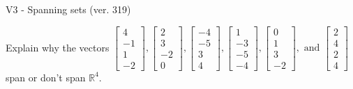 \begin{exercise}
  \begin{exerciseTitle}V3 - Spanning sets (ver. 319)\end{exerciseTitle}
  \begin{exerciseStatement}
    Explain why the vectors \(\left[\begin{array}{r}
4 \\
-1 \\
1 \\
-2
\end{array}\right] , \left[\begin{array}{r}
2 \\
3 \\
-2 \\
0
\end{array}\right] , \left[\begin{array}{r}
-4 \\
-5 \\
3 \\
4
\end{array}\right] , \left[\begin{array}{r}
1 \\
-3 \\
-5 \\
-4
\end{array}\right] , \left[\begin{array}{r}
0 \\
1 \\
3 \\
-2
\end{array}\right] , \text{ and } \left[\begin{array}{r}
2 \\
4 \\
2 \\
4
\end{array}\right]\) span or don't span \(\mathbb{R}^4\). 
	



\end{exerciseStatement}
\end{exercise}
